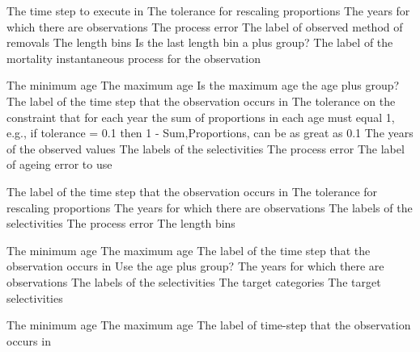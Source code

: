  {The time step to execute in}
 {The tolerance for rescaling proportions}
 {The years for which there are observations}
 {The process error}
 {The label of observed method of removals}
 {The length bins}
 {Is the last length bin a plus group?}
 {The label of the mortality instantaneous process for the observation}
\par\textbf{}\par
{} {The minimum age}
 {The maximum age}
 {Is the maximum age the age plus group?}
 {The label of the time step that the observation occurs in}
 {The tolerance on the constraint that for each year the sum of proportions in each age must equal 1, e.g., if tolerance = 0.1 then 1 - Sum,Proportions, can be as great as 0.1}
 {The years of the observed values}
 {The labels of the selectivities}
 {The process error}
 {The label of ageing error to use}
\par\textbf{}\par
{} {The label of the time step that the observation occurs in}
 {The tolerance for rescaling proportions}
 {The years for which there are observations}
 {The labels of the selectivities}
 {The process error}
 {The length bins}
\par\textbf{}\par
{} {The minimum age}
 {The maximum age}
 {The label of the time step that the observation occurs in}
 {Use the age plus group?}
 {The years for which there are observations}
 {The labels of the selectivities}
 {The target categories}
 {The target selectivities}
\par\textbf{}\par
{} {The minimum age}
 {The maximum age}
 {The label of time-step that the observation occurs in}
